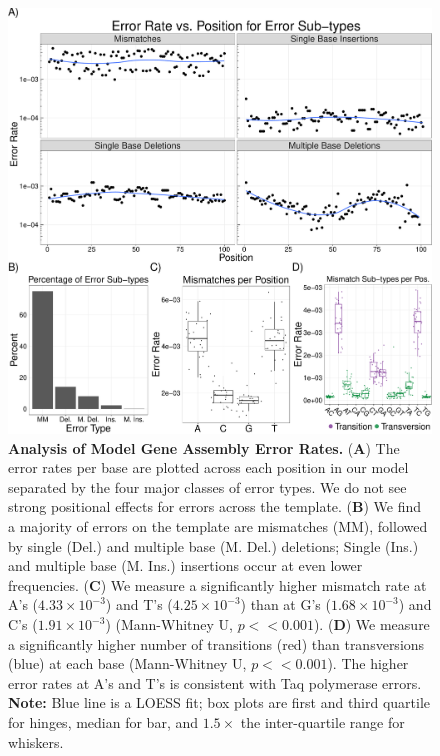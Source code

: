 \documentclass[letterpaper,12pt]{article}
\begin{document}
\clearpage
\begin{figure}[!ht]
\begin{center}
\includegraphics[width=170mm]{Figure_2-1.pdf}
\end{center}
\caption{\small \textbf{Analysis of Model Gene Assembly Error Rates.} (\textbf{A}) The error rates per base are plotted across each position in our model separated  by the four major classes of error types. We do not see strong positional effects for errors across the template. (\textbf{B}) We find a majority of errors on the template are mismatches (MM), followed by single (Del.) and multiple base (M. Del.) deletions; Single (Ins.) and multiple base (M. Ins.) insertions occur at even lower frequencies. (\textbf{C}) We measure a significantly higher mismatch rate at A's ($4.33\times10^{-3}$) and T's ($4.25\times10^{-3}$) than at G's ($1.68\times10^{-3}$) and C's ($1.91\times10^{-3}$) (Mann-Whitney U, $p << 0.001$). (\textbf{D}) We measure a significantly higher number of transitions (red) than transversions (blue) at each base (Mann-Whitney U, $p << 0.001$). The higher error rates at A's and T's is consistent with Taq polymerase errors. \textbf{Note:} Blue line is a LOESS fit; box plots are first and third quartile for hinges, median for bar, and $1.5\times$ the inter-quartile range for whiskers.}
\label{fig:nonDoped}
\end{figure}
\end{document}
